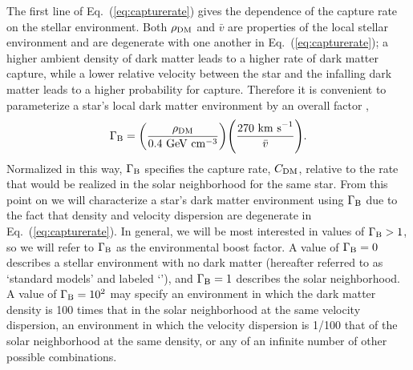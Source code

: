 \documentclass[useAMS,usenatbib]{mnras}
\begin{document}
  The first line of Eq.~(\ref{eq:capturerate}) gives the dependence of the capture rate on the stellar environment. 
  Both $\rho_{\mathrm{DM}}$ and $\bar{v}$ are properties of the local stellar environment and are degenerate with one another in Eq.~(\ref{eq:capturerate}); a higher ambient density 
  of dark matter leads to a higher rate of dark matter capture, while a lower relative velocity between 
  the star and the infalling dark matter leads to a higher probability for capture. 
  Therefore it is convenient to parameterize a star's local dark matter 
  environment by an overall factor \citep{Zentner2011AsymmetricDwarfs,Hurst2015},
%
  \begin{equation}
  \Gamma_\mathrm{B} = \bigg(\frac{\rho_{\mathrm{DM}}}{0.4 \ \mathrm{GeV} \ \mathrm{cm}^{-3}}\bigg) \Bigg(\frac{270 \ \mathrm{km\ s}^{-1}}{\bar{v}}\Bigg).
  \label{eq:gammab}
  \end{equation}
%
  Normalized in this way, 
  $\Gamma_\mathrm{B}$ specifies the capture rate, $C_{\mathrm{DM}}$, relative to 
  the rate that would be realized in the solar neighborhood for the same star. 
  From this point on we will characterize a star's dark matter environment using 
  $\Gamma_\mathrm{B}$ due to the fact that density and velocity dispersion are degenerate in 
  Eq.~(\ref{eq:capturerate}). 
  In general, we will be most interested in values of $\Gamma_\mathrm{B} > 1$, so we will refer 
  to $\Gamma_\mathrm{B}$ as the environmental boost factor. 
  A value of $\Gamma_\mathrm{B} = 0$ describes a stellar environment with no dark matter
  (hereafter referred to as `standard models' and labeled `\nodm'), 
  and $\Gamma_\mathrm{B} = 1$ describes the solar neighborhood. 
  A value of $\Gamma_\mathrm{B} = 10^{2}$ may specify an environment in 
  which the dark matter density is 100 times that in the 
  solar neighborhood at the same velocity dispersion, 
  an environment in which the velocity dispersion is 1/100 
  that of the solar neighborhood at the same density, 
  or any of an infinite number of other possible combinations.
 
\end{document}
